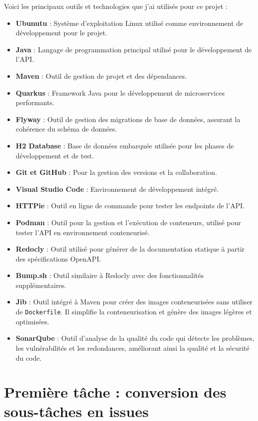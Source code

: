 \documentclass{article}
\begin{document}
	Voici les principaux outils et technologies que j’ai utilisés pour ce projet :
\begin{itemize}
	\item \textbf{Ubunutu} : Système d'exploitation Linux utilisé comme environnement de développement pour le projet.
	\item \textbf{Java} : Langage de programmation principal utilisé pour le développement de l'API.
	\item \textbf{Maven} : Outil de gestion de projet et des dépendances.
	\item \textbf{Quarkus} : Framework Java pour le développement de microservices performants.
	\item \textbf{Flyway} : Outil de gestion des migrations de base de données, assurant la cohérence du schéma de données.
	\item \textbf{H2 Database} : Base de données embarquée utilisée pour les phases de développement et de test.
	\item \textbf{Git et GitHub} : Pour la gestion des versions et la collaboration.
	\item \textbf{Visual Studio Code} : Environnement de développement intégré.
	\item \textbf{HTTPie} : Outil en ligne de commande pour tester les endpoints de l'API.
	\item \textbf{Podman} : Outil pour la gestion et l'exécution de conteneurs, utilisé pour tester l'API en environnement conteneurisé.
	\item \textbf{Redocly} : Outil utilisé pour générer de la documentation statique à partir des spécifications OpenAPI.
	\item\textbf{Bump.sh} : Outil similaire à Redocly avec des fonctionnalités supplémentaires.
	\item \textbf{Jib} : Outil intégré à Maven pour créer des images conteneurisées sans utiliser de \texttt{Dockerfile}. Il simplifie la conteneurisation et génère des images légères et optimisées.
	\item \textbf{SonarQube} : Outil d'analyse de la qualité du code qui détecte les problèmes, les vulnérabilités et les redondances, améliorant ainsi la qualité et la sécurité du code.
\end{itemize}
	
	\section{Première tâche : conversion des sous-tâches en issues}
	
\end{document}
